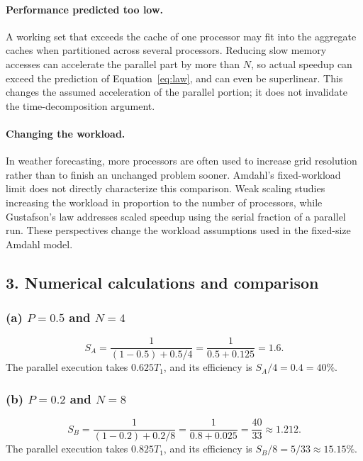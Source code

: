 \documentclass[11pt,a4paper]{article}
\begin{document}
\paragraph{Performance predicted too low.}
A working set that exceeds the cache of one processor may fit into the aggregate caches
when partitioned across several processors. Reducing slow memory accesses
can accelerate the parallel part by more than $N$, so actual speedup can
exceed the prediction of Equation~\eqref{eq:law}, and can even be superlinear.
This changes the assumed acceleration of the parallel portion; it does not
invalidate the time-decomposition argument.

\paragraph{Changing the workload.}
In weather forecasting, more processors are often used to increase grid
resolution rather than to finish an unchanged
problem sooner. Amdahl's fixed-workload limit does not directly characterize
this comparison. Weak scaling studies increasing the workload in proportion
to the number of processors, while Gustafson's law addresses scaled speedup
using the serial fraction of a parallel run. These perspectives change the
workload assumptions used in the fixed-size Amdahl model.

\subsection*{3. Numerical calculations and comparison}
\subsubsection*{(a) $P=0.5$ and $N=4$}
\[
  S_A=\frac{1}{(1-0.5)+0.5/4}
     =\frac{1}{0.5+0.125}
     =\boxed{1.6}.
\]
The parallel execution takes $0.625T_1$, and its efficiency is
$S_A/4=0.4=40\%$.

\subsubsection*{(b) $P=0.2$ and $N=8$}
\[
  S_B=\frac{1}{(1-0.2)+0.2/8}
     =\frac{1}{0.8+0.025}
     =\boxed{\frac{40}{33}\approx1.212}.
\]
The parallel execution takes $0.825T_1$, and its efficiency is
$S_B/8=5/33\approx15.15\%$.
\end{document}
